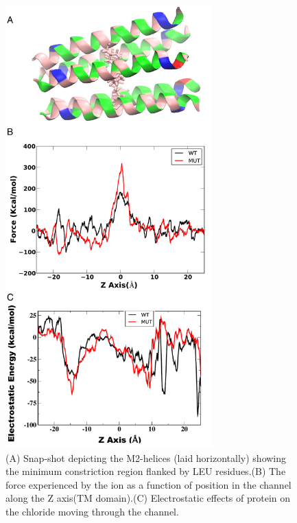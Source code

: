 \documentclass[12pt,onecolumn]{biophys}
\begin{document}

\begin{figure}
\begin{center}
\includegraphics[width = 80mm]{figures/sup1_SMD}
\end{center}
\caption{(A) Snap-shot depicting the M2-helices (laid horizontally) showing the minimum constriction region flanked by LEU residues.(B) The force experienced by the ion as a function of position in the channel along the Z axis(TM domain).(C) Electrostatic effects of protein on the chloride moving through the channel.}
\label{fig:SMD}
\end{figure}
\end{document}
